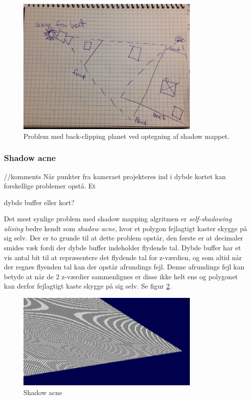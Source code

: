 \documentclass[11pt,a4paper]{article}
\begin{document}
\begin{figure}[ht!]
\centering
\includegraphics[width=90mm]{img/P1.jpg}
\caption{Problem med back-clipping planet ved optegning af shadow mappet.}
\label{P1}
\end{figure}

\subsubsection{Shadow acne}

//komments
Når punkter fra kameraet projekteres ind i dybde kortet kan forskellige problemer opstå. Et 

dybde buffer eller kort?

Det mest synlige problem med shadow mapping algritmen er \textit{self-shadowing alising} bedre kendt som \textit{shadow acne}, hvor et  polygon fejlagtigt kaster skygge på sig selv. Der er to grunde til at dette problem opstår, den første  er at decimaler smides væk fordi der dybde buffer indeholder flydende tal. Dybde buffer har et vis antal bit til at repræsentere det flydende tal for z-værdien,  og som altid når der regnes flyenden tal kan der opstår afrundings fejl. Denne afrundings fejl kan betyde at når de 2 z-værdier sammenlignes er disse ikke helt ens og polygonet kan derfor fejlagtigt kaste skygge på sig selv.  Se figur \ref{S0}.

\begin{figure}[ht!]
\centering
\includegraphics[width=90mm]{img/S0.png}
\caption{Shadow acne}
\label{S0}
\end{figure}
\end{document}
